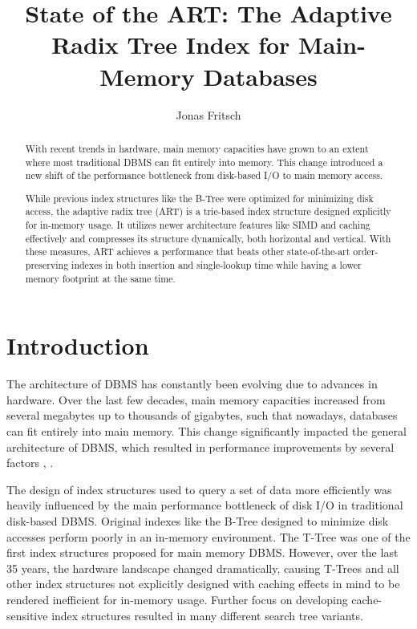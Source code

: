 \documentclass[acmtog, nonacm]{acmart}
\begin{document}
\title{State of the ART: The Adaptive Radix Tree Index for Main-Memory Databases}

\author{Jonas Fritsch}

\begin{abstract}
    With recent trends in hardware, main memory capacities have grown to an extent where most traditional DBMS 
    can fit entirely into memory. This change introduced a new shift of the performance bottleneck 
    from disk-based I/O to main memory access.
    
    While previous index structures like the B-Tree were optimized for minimizing disk access, the 
    adaptive radix tree (ART) is a trie-based index structure designed explicitly for in-memory usage. 
    It utilizes newer architecture features like SIMD and caching effectively and compresses its structure 
    dynamically, both horizontal and vertical. With these measures, ART achieves a performance that beats 
    other state-of-the-art order-preserving indexes in both insertion and single-lookup time while having 
    a lower memory footprint at the same time.
\end{abstract}

\maketitle

\section{Introduction}

The architecture of DBMS has constantly been evolving due to advances in hardware. 
Over the last few decades, main memory capacities increased from several megabytes up to thousands 
of gigabytes, such that nowadays, databases can fit entirely into main memory. This change significantly 
impacted the general architecture of DBMS, which resulted in performance improvements 
by several factors \cite{10.1145/1376616.1376713}, \cite{7097722}.

The design of index structures used to query a set of data more efficiently was heavily influenced 
by the main performance bottleneck of disk I/O in traditional disk-based DBMS. 
Original indexes like the B-Tree designed to minimize disk accesses perform poorly 
in an in-memory environment. 
The T-Tree \cite{lehman1985study} was one of the first index structures proposed for main memory DBMS. 
However, over the last 35 years, the hardware landscape changed dramatically, causing T-Trees 
and all other index structures not explicitly designed with caching effects in mind to be rendered 
inefficient for in-memory usage\cite{rao1998cache}. Further focus on developing cache-sensitive index structures resulted in many 
different search tree variants.
\end{document}
